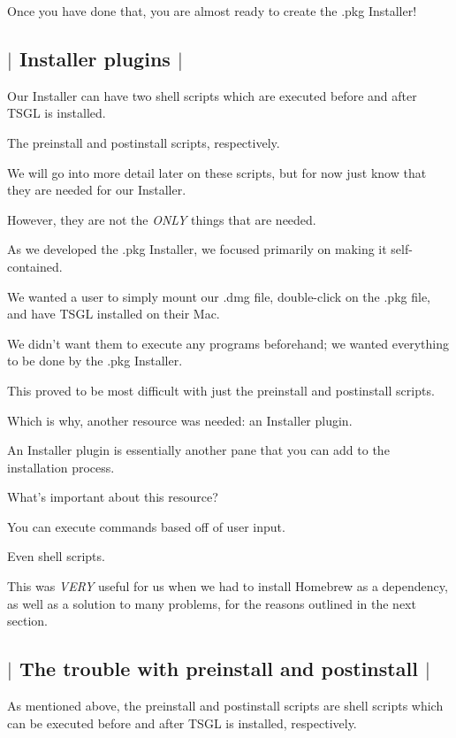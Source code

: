 Once you have done that, you are almost ready to create the {\ttfamily .pkg} Installer! 

 \subsection*{$\vert$ Installer plugins $\vert$ }

Our Installer can have two shell scripts which are executed before and after T\-S\-G\-L is installed.

The {\ttfamily preinstall} and {\ttfamily postinstall} scripts, respectively.

We will go into more detail later on these scripts, but for now just know that they are needed for our Installer.

However, they are not the {\itshape O\-N\-L\-Y} things that are needed.

As we developed the {\ttfamily .pkg} Installer, we focused primarily on making it self-\/contained.

We wanted a user to simply mount our {\ttfamily .dmg} file, double-\/click on the {\ttfamily .pkg} file, and have T\-S\-G\-L installed on their Mac.

We didn't want them to execute any programs beforehand; we wanted everything to be done by the {\ttfamily .pkg} Installer.

This proved to be most difficult with just the {\ttfamily preinstall} and {\ttfamily postinstall} scripts.

Which is why, another resource was needed\-: an Installer plugin.

An Installer plugin is essentially another pane that you can add to the installation process.

What's important about this resource?

You can execute commands based off of user input.

Even shell scripts.

This was {\itshape V\-E\-R\-Y} useful for us when we had to install {\ttfamily Homebrew} as a dependency, as well as a solution to many problems, for the reasons outlined in the next section. 

 \subsection*{$\vert$ The trouble with {\ttfamily preinstall} and {\ttfamily postinstall} $\vert$ }

As mentioned above, the {\ttfamily preinstall} and {\ttfamily postinstall} scripts are shell scripts which can be executed before and after T\-S\-G\-L is installed, respectively.

